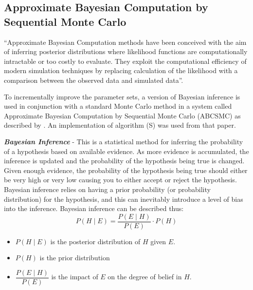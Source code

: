 \subsection{Approximate Bayesian Computation by Sequential Monte Carlo}
``Approximate Bayesian Computation methods have been conceived with the aim of inferring posterior distributions where likelihood functions are computationally intractable or too costly to evaluate. They exploit the computational efficiency of modern simulation techniques by replacing calculation of the likelihood with a comparison between the observed data and simulated data''\cite{Toni2009}.

To incrementally improve the parameter sets, a version of Bayesian inference is used in conjunction with a standard Monte Carlo method in a system called Approximate Bayesian Computation by Sequential Monte Carlo (ABCSMC) as described by \citet{Toni2009}. An implementation of algorithm (S) was used from that paper.

\textbf{\textit{Bayesian Inference}} - This is a statistical method for inferring the probability of a hypothesis based on available evidence. As more evidence is accumulated, the inference is updated and the probability of the hypothesis being true is changed. Given enough evidence, the probability of the hypothesis being true should either be very high or very low causing you to either accept or reject the hypothesis. Bayesian inference relies on having a prior probability (or probability distribution) for the hypothesis, and this can inevitably introduce a level of bias into the inference.
Bayesian inference can be described thus:
\begin{equation}
P(H\mid E) = \dfrac{P(E\mid H)}{P(E)}\cdot P(H)
\label{eq:bayes}
\end{equation}
\begin{itemize}
	\item $P(H\mid E)$ is the posterior distribution of $H$ given $E$.
	\item $P(H)$ is the prior distribution
	\item $\dfrac{P(E\mid H)}{P(E)}$ is the impact of $E$ on the degree of belief in $H$.
\end{itemize}

